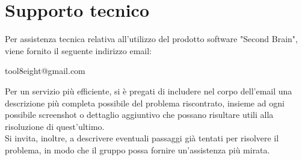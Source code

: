 \documentclass[a4paper,10pt]{article}
\begin{document}
\section{Supporto tecnico}
Per assistenza tecnica relativa all'utilizzo del prodotto software "Second Brain", viene fornito il seguente indirizzo email: 
\begin{center}
    tool8eight@gmail.com
\end{center}
Per un servizio più efficiente, si è pregati di includere nel corpo dell'email una descrizione più completa possibile del problema riscontrato, insieme ad ogni possibile screenshot o dettaglio aggiuntivo che possano risultare utili alla risoluzione di quest'ultimo. \\
Si invita, inoltre, a descrivere eventuali passaggi già tentati per risolvere il problema, in modo che il gruppo possa fornire un'assistenza più mirata.
\end{document}
